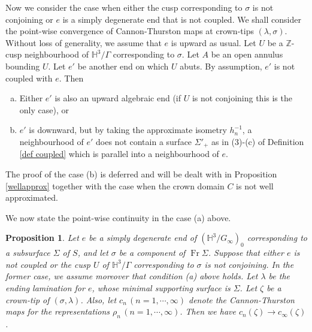 \documentclass{amsart}
\newtheorem{prop}[theorem]{Proposition}
\theoremstyle{definition}
\newcommand{\Fr}{\operatorname{Fr}}
\newcommand{\integers}{\mathbb{Z}}
\newcommand\HHH{{\mathbb H}}
\newcommand\Hyp{{\mathbb H}}
\begin{document}
 Now we consider the case when either the cusp corresponding to $\sigma$ is not conjoining or  $e$ is a simply degenerate end that is not coupled. We shall consider the point-wise convergence of Cannon-Thurston maps at crown-tips $(\lambda, \sigma)$.
  Without loss of generality, we assume that $e$ is upward as usual.
 Let $U$ be a $\integers$-cusp neighbourhood of $\HHH^3/\Gamma$ corresponding to $\sigma$.
 Let $A$ be an open annulus bounding $U$.
 Let $e'$ be another end on which $U$ abuts.
By assumption, $e'$ is not coupled with $e$.
 Then 
  \begin{enumerate}[(a)]
 \item Either $e'$ is also an upward algebraic end (if $U$ is not conjoining this is the only case), or 
 \item $e'$ is downward, but by taking the approximate isometry $h_n^{-1}$, a neighbourhood of $e'$ does not contain a surface $\Sigma'_+$ as in (3)-(c) of Definition \ref{def coupled} which is parallel into a neighbourhood of $e$.
 \end{enumerate}
The proof of the case (b) is deferred and will be dealt with in Proposition \ref{wellapprox} together with the case when the crown domain $C$ is not well approximated.

 We now state the point-wise continuity in the case (a) above.
 \begin{prop}\label{non-coupled}
 Let $e$ be a simply degenerate end of $(\HHH^3/G_\infty)_0$ corresponding to a subsurface $\Sigma$ of $S$, and let $\sigma$ be a component of $\Fr \Sigma$.
 Suppose that  either $e$ is not coupled or the cusp $U$ of $\HHH^3/\Gamma$ corresponding to $\sigma$ is not conjoining.
 In the former case, we assume moreover that   condition (a) above holds. Let $\lambda$ be the ending lamination for $e$, whose minimal supporting surface is $\Sigma$. Let $\zeta$ be a crown-tip of $(\sigma ,\lambda)$. Also, let $c_n\, (n=1, \cdots, \infty)$ denote the Cannon-Thurston maps for the representations $\rho_n\, (n=1, \cdots, \infty)$.
Then we have $c_n (\zeta) \to c_\infty (\zeta)$. 
 \end{prop}
 
\end{document}
